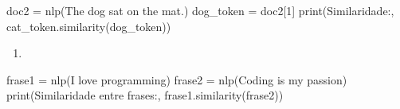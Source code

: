 \documentclass[
  brazilian,
]{article}
\newenvironment{Shaded}{}{}
\newcommand{\BuiltInTok}[1]{#1}
\newcommand{\DecValTok}[1]{\textcolor[rgb]{0.25,0.63,0.44}{#1}}
\newcommand{\NormalTok}[1]{#1}
\newcommand{\OperatorTok}[1]{\textcolor[rgb]{0.40,0.40,0.40}{#1}}
\newcommand{\StringTok}[1]{\textcolor[rgb]{0.25,0.44,0.63}{#1}}
\providecommand{\tightlist}{%
  \setlength{\itemsep}{0pt}\setlength{\parskip}{0pt}}
\begin{document}
\begin{Shaded}
\begin{Highlighting}[]
\NormalTok{doc2 }\OperatorTok{=}\NormalTok{ nlp(}\StringTok{\textquotesingle{}The dog sat on the mat.\textquotesingle{}}\NormalTok{)}
\NormalTok{dog\_token }\OperatorTok{=}\NormalTok{ doc2[}\DecValTok{1}\NormalTok{]}
\BuiltInTok{print}\NormalTok{(}\StringTok{\textquotesingle{}Similaridade:\textquotesingle{}}\NormalTok{, cat\_token.similarity(dog\_token))}
\end{Highlighting}
\end{Shaded}

\begin{enumerate}
\def\labelenumi{\arabic{enumi}.}
\setcounter{enumi}{3}
\tightlist
\item
\end{enumerate}

\begin{Shaded}
\begin{Highlighting}[]
\NormalTok{frase1 }\OperatorTok{=}\NormalTok{ nlp(}\StringTok{\textquotesingle{}I love programming\textquotesingle{}}\NormalTok{)}
\NormalTok{frase2 }\OperatorTok{=}\NormalTok{ nlp(}\StringTok{\textquotesingle{}Coding is my passion\textquotesingle{}}\NormalTok{)}
\BuiltInTok{print}\NormalTok{(}\StringTok{\textquotesingle{}Similaridade entre frases:\textquotesingle{}}\NormalTok{, frase1.similarity(frase2))}
\end{Highlighting}
\end{Shaded}
\end{document}
